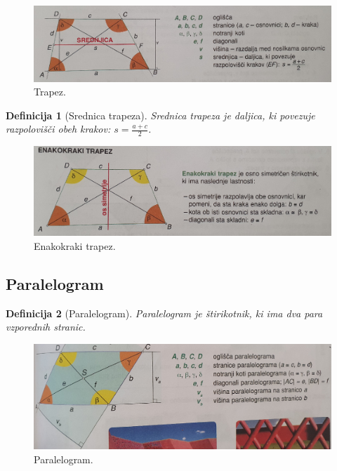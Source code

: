 \documentclass{article}
\newtheorem{definicija}{Definicija}[subsection]
\begin{document}
\begin{figure}[h]
    \includegraphics[width=\linewidth]{trapez.png}
    \centering
    \caption{Trapez.}
\end{figure}

\begin{definicija}[Srednica trapeza]
    Srednica trapeza je daljica, ki povezuje razpolovišči obeh krakov: $s = \frac{a + c}{2}$.
\end{definicija}

\begin{figure}[h]
    \includegraphics[width=\linewidth]{enakokrakiTrapez.png}
    \centering
    \caption{Enakokraki trapez.}
\end{figure}

\pagebreak
\subsection{ Paralelogram }

\begin{definicija}[Paralelogram]
    Paralelogram je štirikotnik, ki ima dva para vzporednih stranic.  
\end{definicija}

\begin{figure}[h]
    \includegraphics[width=0.9\linewidth]{paralelogram.png}
    \centering
    \caption{Paralelogram.}
\end{figure}
\end{document}

